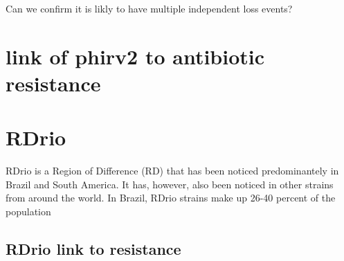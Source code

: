 \documentclass{article}
\begin{document}
Can we confirm it is likly to have multiple independent loss events?
\section{link of phirv2 to antibiotic resistance}

\section{RDrio}

RDrio is a Region of Difference (RD) that has been noticed predominantely in Brazil and South America. It has, however, also been noticed in other strains from around the world. In Brazil, RDrio strains make up 26-40 percent of the population
\subsection{RDrio link to resistance}
\end{document}
